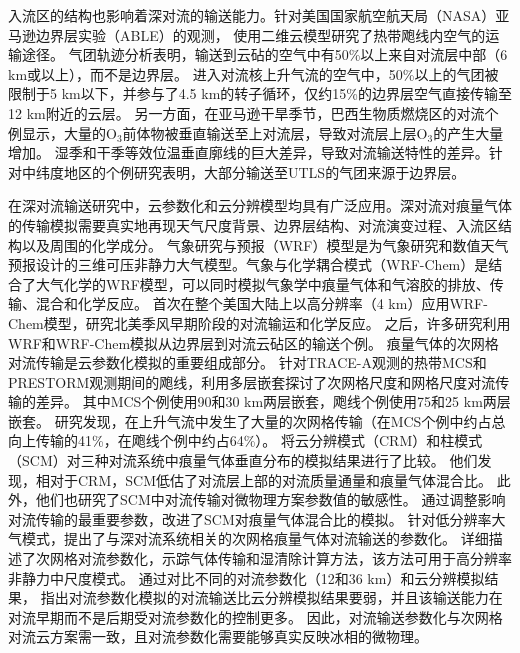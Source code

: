 入流区的结构也影响着深对流的输送能力。针对美国国家航空航天局（NASA）亚马逊边界层实验（ABLE）的观测，
\citet{Scala.1990}使用二维云模型研究了热带飑线内空气的运输途径。
气团轨迹分析表明，输送到云砧的空气中有50\%以上来自对流层中部（6 km或以上），而不是边界层。
进入对流核上升气流的空气中，50\%以上的气团被限制于5 km以下，并参与了4.5 km的转子循环，仅约15\%的边界层空气直接传输至12 km附近的云层。
另一方面，在亚马逊干旱季节，巴西生物质燃烧区的对流个例显示，大量的O$_3$前体物被垂直输送至上对流层，导致对流层上层O$_3$的产生大量增加\citep{Pickering.1992,Pickering.1992a,Pickering.1996}。
湿季和干季等效位温垂直廓线的巨大差异，导致对流输送特性的差异。针对中纬度地区的个例研究表明，大部分输送至UTLS的气团来源于边界层\citep{Mullendore.2005,Skamarock.2000}。

在深对流输送研究中，云参数化和云分辨模型均具有广泛应用。深对流对痕量气体的传输模拟需要真实地再现天气尺度背景、边界层结构、对流演变过程、入流区结构以及周围的化学成分。 气象研究与预报（WRF）模型是为气象研究和数值天气预报设计的三维可压非静力大气模型。气象与化学耦合模式（WRF-Chem）是结合了大气化学的WRF模型，可以同时模拟气象学中痕量气体和气溶胶的排放、传输、混合和化学反应\citep{Fast.2006,Grell.2005}。
\citet{Barth.2012}首次在整个美国大陆上以高分辨率（4 km）应用WRF-Chem模型，研究北美季风早期阶段的对流输运和化学反应。
之后，许多研究利用WRF和WRF-Chem模拟从边界层到对流云砧区的输送个例\citep{Bela.2016,Li.2017b,Li.2018}。
痕量气体的次网格对流传输是云参数化模拟的重要组成部分。
\citet{Wang.1996}针对TRACE-A观测的热带MCS和PRESTORM观测期间的飑线，利用多层嵌套探讨了次网格尺度和网格尺度对流传输的差异。
其中MCS个例使用90和30 km两层嵌套，飑线个例使用75和25 km两层嵌套。
研究发现，在上升气流中发生了大量的次网格传输（在MCS个例中约占总向上传输的41\%，在飑线个例中约占64\%）。
\citet{Ott.2009}将云分辨模式（CRM）和柱模式（SCM）对三种对流系统中痕量气体垂直分布的模拟结果进行了比较。
他们发现，相对于CRM，SCM低估了对流层上部的对流质量通量和痕量气体混合比。
此外，他们也研究了SCM中对流传输对微物理方案参数值的敏感性。
通过调整影响对流传输的最重要参数，改进了SCM对痕量气体混合比的模拟。
\citet{Freitas.2000}针对低分辨率大气模式，提出了与深对流系统相关的次网格痕量气体对流输送的参数化。
\citet{Grell.2014}详细描述了次网格对流参数化，示踪气体传输和湿清除计算方法，该方法可用于高分辨率非静力中尺度模式。
\citet{Li.2018}通过对比不同的对流参数化（12和36 km）和云分辨模拟结果，
指出对流参数化模拟的对流输送比云分辨模拟结果要弱，并且该输送能力在对流早期而不是后期受对流参数化的控制更多。
因此，对流输送参数化与次网格对流云方案需一致，且对流参数化需要能够真实反映冰相的微物理。

